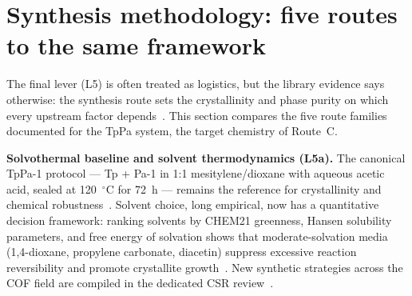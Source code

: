 \section{Synthesis methodology: five routes to the same framework}
\label{sec:synthesis}

The final lever (L5) is often treated as logistics, but the library evidence says otherwise:
the synthesis route sets the crystallinity and phase purity on which every upstream factor
depends~\cite{ghosh2020identification,zhang2022reconstructed}. This section compares the five
route families documented for the TpPa system, the target chemistry of Route~C.

\textbf{Solvothermal baseline and solvent thermodynamics (L5a).} The canonical TpPa-1 protocol
--- Tp + Pa-1 in 1:1 mesitylene/dioxane with aqueous acetic acid, sealed at 120~$^\circ$C for
72~h --- remains the reference for crystallinity and chemical
robustness~\cite{kandambeth2012construction}. Solvent choice, long empirical, now has a
quantitative decision framework: ranking solvents by CHEM21 greenness, Hansen solubility
parameters, and free energy of solvation shows that moderate-solvation media (1,4-dioxane,
propylene carbonate, diacetin) suppress excessive reaction reversibility and promote
crystallite growth~\cite{xu2026structural}. New synthetic strategies across the COF field are
compiled in the dedicated CSR review~\cite{li2020new}.

